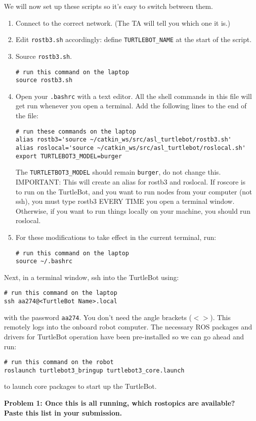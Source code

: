 We will now set up these scripts so it's easy to switch between them.
\begin{enumerate}
	\item Connect to the correct network. (The TA will tell you which one it is.)
	\item Edit \texttt{rostb3.sh} accordingly: define \texttt{TURTLEBOT\_NAME} at the start of the script.
	\item Source \texttt{rostb3.sh}.
	\begin{lstlisting}
# run this command on the laptop
source rostb3.sh
	\end{lstlisting}
	\item Open your \texttt{.bashrc} with a text editor. All the shell commands in this file will get run whenever you open a terminal.
	Add the following lines to the end of the file:
	\begin{lstlisting}
# run these commands on the laptop
alias rostb3='source ~/catkin_ws/src/asl_turtlebot/rostb3.sh'
alias roslocal='source ~/catkin_ws/src/asl_turtlebot/roslocal.sh'
export TURTLEBOT3_MODEL=burger
	\end{lstlisting}
	The \texttt{TURTLETBOT3\_MODEL} should remain \texttt{burger}, do not change this.
	IMPORTANT: This will create an alias for rostb3 and roslocal. If roscore is to run on the TurtleBot, and you want to run nodes from your computer (not ssh), you must type rostb3 EVERY TIME you open a terminal window. Otherwise, if you want to run things locally on your machine, you should run roslocal.
	\item For these modifications to take effect in the current terminal, run:
	\begin{lstlisting}
# run this command on the laptop
source ~/.bashrc
	\end{lstlisting}
\end{enumerate}

Next, in a terminal window, ssh into the TurtleBot using:
\begin{lstlisting}
# run this command on the laptop
ssh aa274@<TurtleBot Name>.local
\end{lstlisting}

with the password \texttt{aa274}. You don't need the angle brackets ($<>$). This remotely logs into the onboard robot computer. The necessary ROS packages
and drivers for TurtleBot operation have been pre-installed so we can go ahead and run:

\begin{lstlisting}
# run this command on the robot
roslaunch turtlebot3_bringup turtlebot3_core.launch	
\end{lstlisting}

to launch core packages to start up the TurtleBot.

{\bf Problem 1: Once this is all running, which rostopics are available? Paste this list in your submission.}
